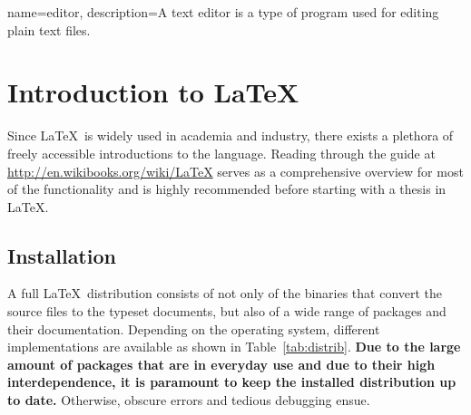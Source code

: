 % 
% 
% 
% 



{
	name={editor},
	description={A text editor is a type of program used for editing plain text files.}
}

\chapter{Introduction to \LaTeX}

Since \LaTeX\ is widely used in academia and industry, there exists a plethora of freely accessible introductions to the language.
Reading through the guide at \url{http://en.wikibooks.org/wiki/LaTeX} serves as a comprehensive overview for most of the functionality and is highly recommended before starting with a thesis in \LaTeX.

\section{Installation}

A full \LaTeX\ distribution consists of not only of the binaries that convert the source files to the typeset documents, but also of a wide range of packages and their documentation.
Depending on the operating system, different implementations are available as shown in Table~\ref{tab:distrib}.
\textbf{Due to the large amount of packages that are in everyday use and due to their high interdependence, it is paramount to keep the installed distribution up to date.}
Otherwise, obscure errors and tedious debugging ensue.

